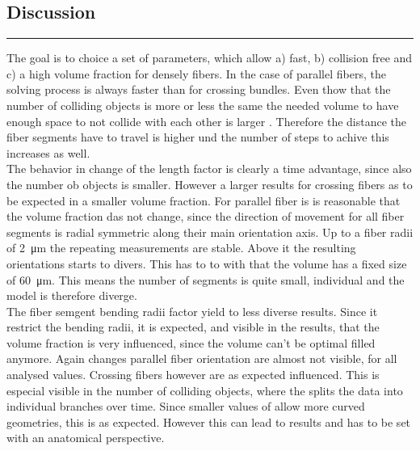 \subsection{Discussion}
% 

% 
% 
\par
\noindent\rule{\textwidth}{2pt}
\par
% 
The goal is to choice a set of parameters, which allow a) fast, b) collision free and c) a high volume fraction for densely fibers.
In the case of parallel fibers, the solving process is always faster than for crossing bundles.
Even thow that the number of colliding objects is more or less \dummy{} the same  the needed volume to have enough space to not collide with each other is larger \dummy{}.
Therefore the distance the fiber segments have to travel is higher und the number of steps to achive this increases as well.
\\
% 
The behavior in change of the length factor \segLengthFactor{} is clearly a time advantage, since also the number ob objects is smaller.
However a larger \segLengthFactor{} results for crossing fibers as to be expected in a smaller volume fraction.
For parallel fiber is is reasonable that the volume fraction das not change, since the direction of movement for all fiber segments is radial symmetric along their main orientation axis.
Up to a fiber radii of \SI{2}{\micro\meter} the repeating measurements are stable.
Above it the resulting orientations starts to divers.
This has to to with that the volume has a fixed size of \SI{60}{\micro\meter}.
This means the number of segments is quite small, individual and the model is therefore diverge.
\\
The fiber semgent bending radii factor \segRadiusFactor{} yield to less diverse results.
Since it restrict the bending radii, it is expected, and visible in the results, that the volume fraction is very influenced, since the volume can't be optimal filled anymore.
Again changes parallel fiber orientation are almost not visible, for all analysed values.
Crossing fibers however are as expected influenced.
This is especial visible in the number of colliding objects, where the \segRadiusFactor{} splits the data into individual branches over time.
Since smaller values of \segRadiusFactor{} allow more curved geometries, this is as expected.
However this can lead to  results and has to be set with an anatomical perspective. 
